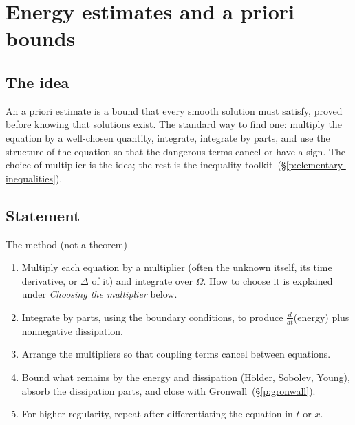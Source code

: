 
\section{Energy estimates and a priori bounds}\label{p:energy-estimates}


\subsection*{The idea}

An a priori estimate is a bound that every smooth solution must satisfy, proved before knowing that solutions exist. The standard way to find one: multiply the equation by a well-chosen quantity, integrate, integrate by parts, and use the structure of the equation so that the dangerous terms cancel or have a sign. The choice of multiplier is the idea; the rest is the inequality toolkit~(\S\ref{p:elementary-inequalities}).

\subsection*{Statement}

\begin{thmbox}{The method (not a theorem)}
\begin{enumerate}
\item Multiply each equation by a multiplier (often the unknown itself, its time derivative, or $\Delta$ of it) and integrate over $\Omega$. How to choose it is explained under \emph{Choosing the multiplier} below.
\item Integrate by parts, using the boundary conditions, to produce $\frac{d}{dt}$(energy) plus nonnegative dissipation.
\item Arrange the multipliers so that coupling terms cancel between equations.
\item Bound what remains by the energy and dissipation (Hölder, Sobolev, Young), absorb the dissipation parts, and close with Gronwall~(\S\ref{p:gronwall}).
\item For higher regularity, repeat after differentiating the equation in $t$ or $x$.
\end{enumerate}
\end{thmbox}

